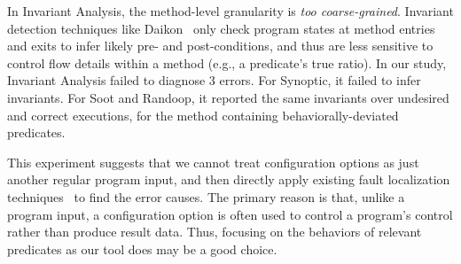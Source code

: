 In Invariant Analysis, the method-level granularity is \textit{too coarse-grained}.
Invariant detection techniques like Daikon~\cite{Ernst:1999}
only check program states at method entries and exits to infer
likely pre- and post-conditions, and thus are less
sensitive to control flow details within a method (e.g., a predicate's
true ratio). In our study, Invariant Analysis failed to diagnose 3
errors.  For Synoptic, it failed to infer invariants.  For Soot and
Randoop, it reported the same invariants
over undesired and correct executions, for
the method containing behaviorally-deviated predicates.





This experiment suggests that we cannot
treat configuration options as just another regular program input,
and then directly apply existing 
fault localization techniques~\cite{Jones:2002, McCamant:2003} to
find the error causes. 
The primary reason is that, unlike a program input,
a configuration option is often used to control a
program's control rather than produce result data. 
Thus, focusing on the behaviors of relevant predicates as our tool does
 may be a good choice.
